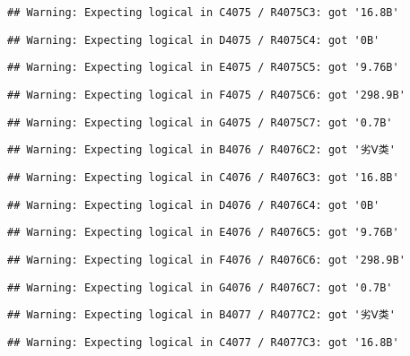 \documentclass[
]{article}
\begin{document}
\begin{verbatim}
## Warning: Expecting logical in C4075 / R4075C3: got '16.8B'
\end{verbatim}

\begin{verbatim}
## Warning: Expecting logical in D4075 / R4075C4: got '0B'
\end{verbatim}

\begin{verbatim}
## Warning: Expecting logical in E4075 / R4075C5: got '9.76B'
\end{verbatim}

\begin{verbatim}
## Warning: Expecting logical in F4075 / R4075C6: got '298.9B'
\end{verbatim}

\begin{verbatim}
## Warning: Expecting logical in G4075 / R4075C7: got '0.7B'
\end{verbatim}

\begin{verbatim}
## Warning: Expecting logical in B4076 / R4076C2: got '劣Ⅴ类'
\end{verbatim}

\begin{verbatim}
## Warning: Expecting logical in C4076 / R4076C3: got '16.8B'
\end{verbatim}

\begin{verbatim}
## Warning: Expecting logical in D4076 / R4076C4: got '0B'
\end{verbatim}

\begin{verbatim}
## Warning: Expecting logical in E4076 / R4076C5: got '9.76B'
\end{verbatim}

\begin{verbatim}
## Warning: Expecting logical in F4076 / R4076C6: got '298.9B'
\end{verbatim}

\begin{verbatim}
## Warning: Expecting logical in G4076 / R4076C7: got '0.7B'
\end{verbatim}

\begin{verbatim}
## Warning: Expecting logical in B4077 / R4077C2: got '劣Ⅴ类'
\end{verbatim}

\begin{verbatim}
## Warning: Expecting logical in C4077 / R4077C3: got '16.8B'
\end{verbatim}
\end{document}
